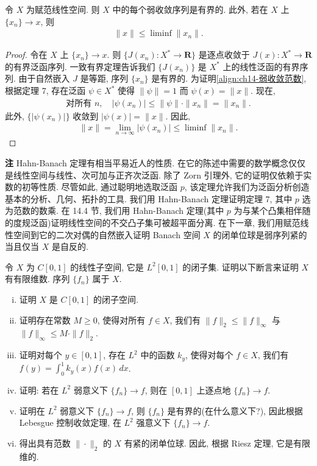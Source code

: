 \documentclass[../../main.tex]{subfiles}
\begin{document}
\begin{theorem}\label{theorem:ch14-弱收敛有界}
令 $X$ 为赋范线性空间. 则 $X$ 中的每个弱收敛序列是有界的. 此外, 若在 $X$ 上 $\{x_{n}\}\to x$, 则
\begin{align}
\|x\|\leqslant\liminf\|x_{n}\|.\label{align:ch14-弱收敛范数}
\end{align}
\end{theorem}

\begin{proof}
令在 $X$ 上 $\{x_{n}\}\to x$. 则 $\{J(x_{n}):X^{*}\to\mathbf{R}\}$ 是逐点收敛于 $J(x):X^{*}\to\mathbf{R}$ 的有界泛函序列. 一致有界定理告诉我们 $\{J(x_{n})\}$ 是 $X^{*}$ 上的线性泛函的有界序列. 由于自然嵌入 $J$ 是等距, 序列 $\{x_{n}\}$ 是有界的. 为证明\eqref{align:ch14-弱收敛范数}, 根据定理 7, 存在泛函 $\psi\in X^{*}$ 使得 $\|\psi\|=1$ 而 $\psi(x)=\|x\|$. 现在,
\begin{align*}
\text{对所有 }n,\quad|\psi(x_{n})|\leqslant\|\psi\|\cdot\|x_{n}\|=\|x_{n}\|.
\end{align*}
此外, $\{|\psi(x_{n})|\}$ 收敛到 $|\psi(x)|=\|x\|$. 因此,
\begin{align*}
\|x\|=\lim_{n\to\infty}|\psi(x_{n})|\leqslant\liminf\|x_{n}\|.
\end{align*}
\end{proof}

\textbf{注} Hahn-Banach 定理有相当平易近人的性质. 在它的陈述中需要的数学概念仅仅是线性空间与线性、次可加与正齐次泛函. 除了 Zorn 引理外, 它的证明仅依赖于实数的初等性质. 尽管如此, 通过聪明地选取泛函 $p$, 该定理允许我们为泛函分析创造基本的分析、几何、拓扑的工具. 我们用 Hahn-Banach 定理证明定理 7, 其中 $p$ 选为范数的数乘. 在 14.4 节, 我们用 Hahn-Banach 定理(其中 $p$ 为与某个凸集相伴随的度规泛函)证明线性空间的不交凸子集可被超平面分离. 在下一章, 我们用赋范线性空间到它的二次对偶的自然嵌入证明 Banach 空间 $X$ 的闭单位球是弱序列紧的当且仅当 $X$ 是自反的.

\begin{exercise}\label{exercise:ch14-19}
令 $X$ 为 $C[0,1]$ 的线性子空间, 它是 $L^{2}[0,1]$ 的闭子集. 证明以下断言来证明 $X$ 有有限维数. 序列 $\{f_{n}\}$ 属于 $X$.
\begin{enumerate}[(i)]
\item 证明 $X$ 是 $C[0,1]$ 的闭子空间.
\item 证明存在常数 $M\geqslant 0$, 使得对所有 $f\in X$, 我们有 $\|f\|_{2}\leqslant\|f\|_{\infty}$ 与 $\|f\|_{\infty}\leqslant M\cdot\|f\|_{2}$.
\item 证明对每个 $y\in[0,1]$, 存在 $L^{2}$ 中的函数 $k_{y}$, 使得对每个 $f\in X$, 我们有 $f(y)=\int_{0}^{1}k_{y}(x)f(x)\,dx$.
\item 证明: 若在 $L^{2}$ 弱意义下 $\{f_{n}\}\to f$, 则在 $[0,1]$ 上逐点地 $\{f_{n}\}\to f$.
\item 证明在 $L^{2}$ 弱意义下 $\{f_{n}\}\to f$, 则 $\{f_{n}\}$ 是有界的(在什么意义下?), 因此根据 Lebesgue 控制收敛定理, 在 $L^{2}$ 强意义下 $\{f_{n}\}\to f$.
\item 得出具有范数 $\|\cdot\|_{2}$ 的 $X$ 有紧的闭单位球. 因此, 根据 Riesz 定理, 它是有限维的.
\end{enumerate}
\end{exercise}
\end{document}
